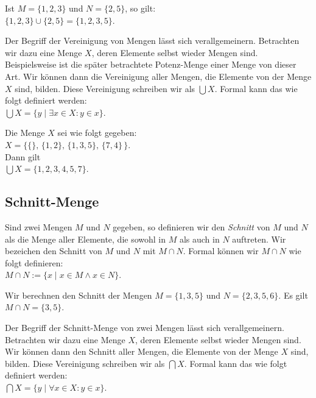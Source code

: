 \example
Ist  $M = \{1,2,3\}$ und $N = \{2,5\}$, so gilt: \\[0.2cm]
\hspace*{1.3cm} $\{1,2,3\} \cup \{2,5\} = \{1,2,3,5\}$. 
\eox
\vspace{0.2cm}

\noindent
Der Begriff der Vereinigung von Mengen lässt sich verallgemeinern.  Betrachten
wir dazu eine Menge $X$, deren Elemente selbst wieder Mengen sind. Beispielsweise ist die 
später betrachtete Potenz-Menge 
einer Menge von dieser Art.  Wir können dann die Vereinigung aller Mengen, die Elemente
von der Menge $X$ sind, bilden.  Diese Vereinigung schreiben wir als $\bigcup X$.  Formal
kann das wie folgt definiert werden: \\[0.2cm]
\hspace*{1.3cm} $\bigcup X = \{ y \;|\; \exists x \in X: y \in x \}$.

\example
Die Menge $X$ sei wie folgt gegeben: \\[0.2cm]
\hspace*{1.3cm} $X = \big\{ \{\},\, \{1,2\}, \, \{1,3,5\}, \, \{7,4\}\,\big\}$. \\[0.2cm]
Dann gilt \\[0.2cm]
\hspace*{1.3cm} $\bigcup X = \{ 1, 2, 3, 4, 5, 7 \}$.
\eox

\subsection{Schnitt-Menge}
Sind zwei Mengen $M$ und $N$ gegeben, so definieren wir den \emph{Schnitt} von
$M$ und $N$ als die Menge aller Elemente, die sowohl in $M$ als auch in $N$
auftreten.  Wir bezeichen den Schnitt von $M$ und $N$ mit $M \cap N$.
Formal können wir $M \cap N$ wie folgt definieren: \\[0.2cm]
\hspace*{1.3cm} $M \cap N := \{ x \mid x \in M \wedge x \in N \}$. 

\example
Wir berechnen den Schnitt der  Mengen $M = \{ 1, 3, 5 \}$ und $N = \{ 2, 3, 5, 6 \}$.  Es gilt
\\[0.2cm]
\hspace*{1.3cm} $M \cap N = \{ 3, 5 \}$.
\eox
\vspace{0.2cm}

\noindent
Der Begriff der Schnitt-Menge von zwei Mengen lässt sich verallgemeinern.  Betrachten
wir dazu eine Menge $X$, deren Elemente selbst wieder Mengen sind.  Wir können dann den
Schnitt aller Mengen, die Elemente von der Menge $X$ sind, bilden.  Diese Vereinigung
schreiben wir als $\bigcap X$.  Formal kann das wie folgt definiert werden: \\[0.2cm]
\hspace*{1.3cm} $\bigcap X = \{ y \;|\; \forall x \in X: y \in x \}$.

